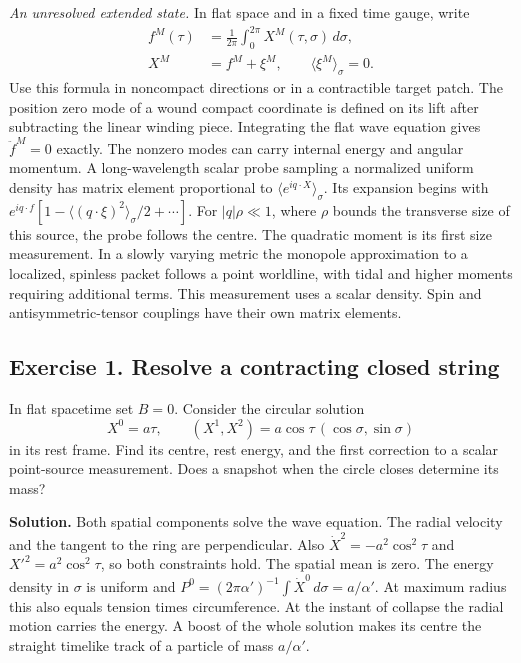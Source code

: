 \documentclass[10pt]{article}
\begin{document}
\emph{An unresolved extended state.} In flat space and in a fixed time gauge, write
\begin{equation}
\begin{aligned}
 f^M(\tau)&=\frac{1}{2\pi}\int_0^{2\pi}X^M(\tau,\sigma)\,d\sigma,\\
 X^M&=f^M+\xi^M,\qquad \langle\xi^M\rangle_\sigma=0 .
\end{aligned}
 \label{eq:mean}
\end{equation}
Use this formula in noncompact directions or in a contractible target patch. The position zero mode of a wound compact coordinate is defined on its lift after subtracting the linear winding piece. Integrating the flat wave equation gives $\ddot f^M=0$ exactly. The nonzero modes can carry internal energy and angular momentum. A long-wavelength scalar probe sampling a normalized uniform density has matrix element proportional to $\langle e^{iq\cdot X}\rangle_\sigma$. Its expansion begins with $e^{iq\cdot f}[1-\langle(q\cdot\xi)^2\rangle_\sigma/2+\cdots]$. For $|q|\rho\ll1$, where $\rho$ bounds the transverse size of this source, the probe follows the centre. The quadratic moment is its first size measurement. In a slowly varying metric the monopole approximation to a localized, spinless packet follows a point worldline, with tidal and higher moments requiring additional terms. This measurement uses a scalar density. Spin and antisymmetric-tensor couplings have their own matrix elements.

\subsection{Exercise 1. Resolve a contracting closed string}
In flat spacetime set $B=0$. Consider the circular solution
\begin{equation}
 X^0=a\tau,\qquad (X^1,X^2)=a\cos\tau\,(\cos\sigma,\sin\sigma)
 \label{eq:ring}
\end{equation}
in its rest frame. Find its centre, rest energy, and the first correction to a scalar point-source measurement. Does a snapshot when the circle closes determine its mass?

\noindent\textbf{Solution.}
Both spatial components solve the wave equation. The radial velocity and the tangent to the ring are perpendicular. Also $\dot X^2=-a^2\cos^2\tau$ and $X'^2=a^2\cos^2\tau$, so both constraints hold. The spatial mean is zero. The energy density in $\sigma$ is uniform and $P^0=(2\pi\alpha')^{-1}\int\dot X^0\,d\sigma=a/\alpha'$. At maximum radius this also equals tension times circumference. At the instant of collapse the radial motion carries the energy. A boost of the whole solution makes its centre the straight timelike track of a particle of mass $a/\alpha'$.
\end{document}
